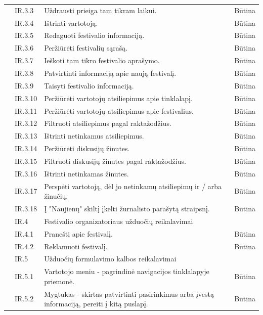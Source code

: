 \documentclass{VUMIFPSkursinis}
\begin{document}
\begin{longtable}{|p{1cm}|p{3cm}|p{9cm}|c|}
 & IR.3.3 & Uždrausti prieiga tam tikram laikui. & Būtina \\ \cline{2-4} 
 & IR.3.4 & Ištrinti vartotoją. & Būtina \\ \cline{2-4} 
 & IR.3.5 & Redaguoti festivalio informaciją. & Būtina \\ \cline{2-4} 
 & IR.3.6 & Peržiūrėti festivalių sąrašą. & Būtina \\ \cline{2-4} 
 & IR.3.7 & Ieškoti tam tikro festivalio aprašymo. & Būtina \\ \cline{2-4} 
 & IR.3.8 & Patvirtinti informaciją apie naują festivalį. & Būtina \\ \cline{2-4} 
 & IR.3.9 & Taisyti festivalio informaciją. & Būtina \\ \cline{2-4} 
 & IR.3.10 & Peržiūrėti vartotojų atsiliepimus apie tinklalapį. & Būtina \\ \cline{2-4} 
 & IR.3.11 & Peržiūrėti vartotojų atsiliepimus apie festivalius. & Būtina \\ \cline{2-4} 
 & IR.3.12 & Filtruoti atsiliepimus pagal raktažodžius. & Būtina \\ \cline{2-4} 
 & IR.3.13 & Ištrinti netinkamus atsiliepimus. & Būtina \\ \cline{2-4} 
 & IR.3.14 & Peržiūrėti diskusijų žinutes. & Būtina \\ \cline{2-4} 
 & IR.3.15 & Filtruoti diskusijų žinutes pagal raktažodžius. & Būtina \\ \cline{2-4} 
 & IR.3.16 & Ištrinti netinkamas žinutes. & Būtina \\ \cline{2-4} 
 & IR.3.17 & Perspėti vartotoją, dėl jo netinkamų atsiliepimų ir / arba žinučių. & Būtina \\ \cline{2-4} 
 & IR.3.18 & Į "Naujienų" skiltį įkelti žurnalisto parašytą straipsnį. & Būtina \\ \cline{2-4} 
 &  \cellcolor{light-gray}IR.4 & \multicolumn{2}{l|}{ \cellcolor{light-gray}Festivalio organizatoriaus užduočių reikalavimai} \\ \cline{2-4} 
 & IR.4.1 & Pranešti apie festivalį. & Būtina \\ \cline{2-4} 
 & IR.4.2 & Reklamuoti festivalį. & Būtina \\ \cline{2-4} 
 &  \cellcolor{light-gray}IR.5 & \multicolumn{2}{l|}{ \cellcolor{light-gray}Užduočių formulavimo kalbos reikalavimai} \\ \cline{2-4} 
 & IR.5.1 & Vartotojo meniu - pagrindinė navigacijos tinklalapyje priemonė. & Būtina \\ \cline{2-4} 
 & IR.5.2 & Mygtukas - skirtas patvirtinti pasirinkimus arba įvestą informaciją, pereiti į kitą puslapį. & Būtina \\ \cline{2-4} 

\end{longtable}
\end{document}
